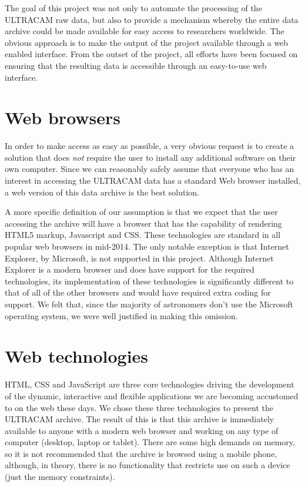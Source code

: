 The goal of this project was not only to automate the processing of the ULTRACAM raw data, but also to provide a mechanism whereby the entire data archive could be made available for easy access to researchers worldwide. The obvious approach is to make the output of the project available through a web enabled interface. From the outset of the project, all efforts have been focused on ensuring that the resulting data is accessible through an easy-to-use web interface. 

\section{Web browsers}
In order to make access as easy as possible, a very obvious request is to create a solution that does \emph{not} require the user to install any additional software on their own computer. Since we can reasonably safely assume that everyone who has an interest in accessing the ULTRACAM data has a standard Web browser installed, a web version of this data archive is the best solution. 

A more specific definition of our assumption is that we expect that the user accessing the archive will have a browser that has the capability of rendering HTML5 markup, Javascript and CSS. These technologies are standard in all popular web browsers in mid-2014. The only notable exception is that Internet Explorer, by Microsoft, is not supported in this project. Although Internet Explorer is a modern browser and does have support for the required technologies, its implementation of these technologies is significantly different to that of all of the other browsers and would have required extra coding for support. We felt that, since the majority of astronomers don't use the Microsoft operating system, we were well justified in making this omission.  

\section{Web technologies}
HTML, CSS and JavaScript are three core technologies driving the development of the dynamic, interactive and flexible applications we are becoming accustomed to on the web these days. We chose these three technologies to present the ULTRACAM archive. The result of this is that this archive is immediately available to anyone with a modern web browser and working on any type of computer (desktop, laptop or tablet). There are some high demands on memory, so it is not recommended that the archive is browsed using a mobile phone, although, in theory, there is no functionality that restricts use on such a device (just the memory constraints). 

